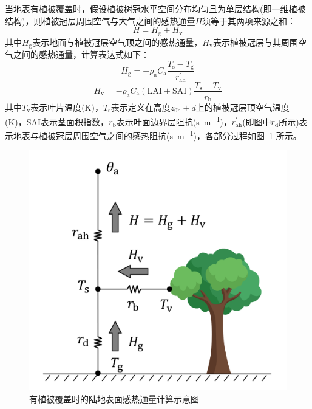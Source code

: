 当地表有植被覆盖时，假设植被树冠水平空间分布均匀且为单层结构(即一维植被结构)，则植被冠层周围空气与大气之间的感热通量$H$须等于其两项来源之和：
\begin{equation}\label{HV_balance}
  H=H_{\mathrm{g}}+H_{\mathrm{v}}
\end{equation}
其中$H_{\mathrm{g}}$表示地面与植被冠层空气顶之间的感热通量，$H_{\mathrm{v}}$表示植被冠层与其周围空气之间的感热通量，计算表达式如下：
\begin{equation}
  H_{\mathrm{g}}=-\rho_{\mathrm{a}} C_{\mathrm{a}} \frac{T_{\mathrm{s}}-T_{\mathrm{g}}}{r_{\mathrm{a h}}^{\prime}}
\end{equation}
\begin{equation}
  H_{\mathrm{v}}=-\rho_{\mathrm{a}} C_{\mathrm{a}}(\text {LAI}+\text {SAI}) \frac{T_{\mathrm{s}}-T_{\mathrm{v}}}{r_{\mathrm{b}}}
\end{equation}
其中$T_{\mathrm {v}}$表示叶片温度(K)，$T_{\mathrm {s}}$表示定义在高度$z_{\mathrm{0h}}+d$上的植被冠层顶空气温度(K)，SAI表示茎面积指数，$r_{\mathrm {b}}$表示叶面边界层阻抗(\unit{s.m^{-1}})，$r_{\mathrm{ah}}^\prime$(即图中$r_{\mathrm {d}}$所示)表示地表与植被冠层周围空气之间的感热阻抗(\unit{s.m^{-1}})，各部分过程如图~\ref{fig:有植被覆盖部分的陆地表面感热通量示意图} 所示。
{
  \begin{figure}[htbp]
    \centering
    \includegraphics[width=0.6\linewidth]{Figures/地表湍流交换过程/有植被感热交换阻抗示意图_v2.png}
    \caption{有植被覆盖时的陆地表面感热通量计算示意图}
    \label{fig:有植被覆盖部分的陆地表面感热通量示意图}
  \end{figure}
}

